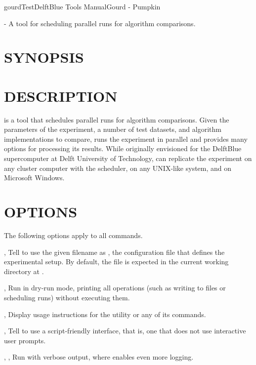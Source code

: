 \documentclass[a4paper,english]{article}
\begin{document}
	\pagestyle{fancy}



  \begin{Name}{1}{gourd}{Test}{DelftBlue Tools Manual}{Gourd - Pumpkin}

       - A tool for scheduling parallel runs for algorithm comparisons.

  \end{Name}
  \section{SYNOPSIS}

          

  \section{DESCRIPTION}

     is a tool that schedules parallel runs for algorithm comparisons.
    Given the parameters of the experiment, a number of test datasets, and algorithm implementations to compare,
     runs the experiment in parallel and provides many options for processing its results.
    While originally envisioned for the DelftBlue supercomputer at Delft University of Technology,
     can replicate the experiment on any cluster computer with the  scheduler,
    on any UNIX-like system, and on Microsoft Windows.

    \section{OPTIONS}

    The following options apply to all  commands.

    \begin{Description}[Options]\setlength{\itemsep}{0cm}
    \item[\OptArg{-c}{ filename}, \OptArg{--config}{ filename}]
    Tell  to use the given filename as , the configuration
    file that defines the experimental setup.
    By default, the file is expected in the current working directory at .
    \item[\Opt{-d}, \Opt{--dry-run}]
    Run  in dry-run mode, printing all operations (such as writing to files or scheduling runs)
    without executing them.
    \item[\Opt{-h}, \Opt{--help}]
    Display usage instructions for the  utility or any of its commands.
    \item[\Opt{-s}, \Opt{--script}]
    Tell  to use a script-friendly interface, that is, one that does not use
    interactive user prompts.
    \item[\Opt{-v}, \Opt{-vv}, \Opt{--verbose}]
    Run  with verbose output, where  enables even more logging.
    \end{Description}
\end{document}
